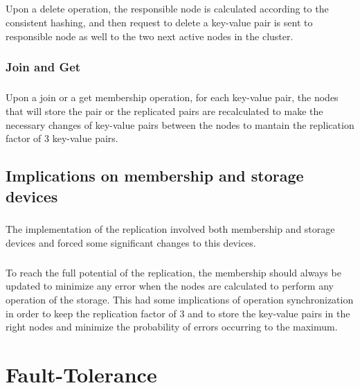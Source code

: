 \documentclass{report}
\begin{document}
					\paragraph{} Upon a delete operation, the responsible node is calculated
					according to the consistent hashing, and then request to delete a
					key-value pair is sent to responsible node as well to the two next 
					active nodes in the cluster.

				\subsection{Join and Get}
					\paragraph{} Upon a join or a get membership operation, for each key-value 
					pair, the nodes that will store the pair or the replicated pairs are
					recalculated to make the necessary changes of key-value pairs between
					the nodes to mantain the replication factor of 3 key-value pairs.

			\section{Implications on membership and storage devices}
	
				\paragraph{} The implementation of the replication involved both membership
				and storage devices and forced some significant changes to this devices.
				
				\paragraph{} To reach the full potential of the replication, the membership
				should always be updated to minimize any error when the nodes are calculated
				to perform any operation of the storage. This had some implications of
				operation synchronization in order to keep the replication factor of
				3 and to store the key-value pairs in the right nodes and minimize the 
				probability of errors occurring to the maximum.

	\chapter{Fault-Tolerance}
	
\end{document}
